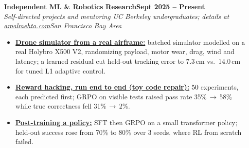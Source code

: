 \documentclass[10pt]{article}
\newcommand{\role}[4]{\textbf{#1}\hfill\textbf{#2}\\\textit{#3}\hfill\textit{#4}}
\begin{document}
\role{Independent ML \& Robotics Research}{Sept 2025 -- Present}{Self-directed projects and mentoring UC Berkeley undergraduates; details at \href{https://amalmehta.com/}{amalmehta.com}}{San Francisco Bay Area}
\begin{itemize}
\item \href{https://amalmehta.com/DroneAutonomy/}{\textbf{Drone simulator from a real airframe:}} batched simulator modelled on a real Holybro X500 V2, randomizing payload, motor wear, drag, wind and latency; a learned residual cut held-out tracking error to 7.3\,cm vs.\ 14.0\,cm for tuned L1 adaptive control.
\item \href{https://amalmehta.com/long_term_horizon_planning/}{\textbf{Reward hacking, run end to end (toy code repair):}} 50 experiments, each predicted first; GRPO on visible tests raised pass rate 35\%\,$\to$\,58\% while true correctness fell 31\%\,$\to$\,2\%.
\item \href{https://github.com/amalmehta/PostTrainingLab}{\textbf{Post-training a policy:}} SFT then GRPO on a small transformer policy; held-out success rose from 70\% to 80\% over 3 seeds, where RL from scratch failed.
\end{itemize}
\end{document}
